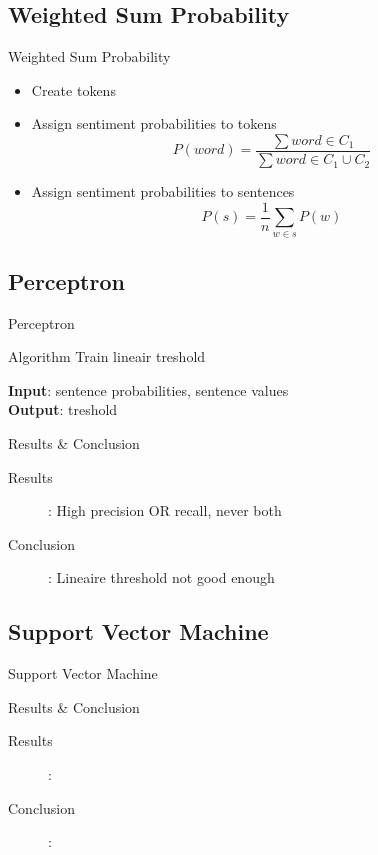 \documentclass{beamer}
\begin{document}
\subsection{Weighted Sum Probability}
\begin{frame}{Weighted Sum Probability}
\begin{itemize}
\item Create tokens
\item Assign sentiment probabilities to tokens
\begin{equation}
P(word) = \frac{ \sum word \in C_1}{\sum word \in C_1\cup C_2}
\end{equation}
\item Assign sentiment probabilities to sentences
\begin{equation}
P(s) = \frac{1}{n} \sum_{w \in s} P(w)
\end{equation}
\end{itemize}
\end{frame}

\subsection{Perceptron}
\begin{frame}{Perceptron}
\begin{block}{Algorithm}
Train lineair treshold
\end{block}
\textbf{Input}: sentence probabilities, sentence values\\
\textbf{Output}: treshold
\end{frame}
\begin{frame}{Results \& Conclusion}
\begin{description}
\item[Results]: High precision OR recall, never both
\item[Conclusion]: Lineaire threshold not good enough
\end{description}
\end{frame}

\subsection{Support Vector Machine}
\begin{frame}{Support Vector Machine}
\end{frame}
\begin{frame}{Results \& Conclusion}
\begin{description}
\item[Results]: 
\item[Conclusion]: 
\end{description}
\end{frame}
\end{document}
